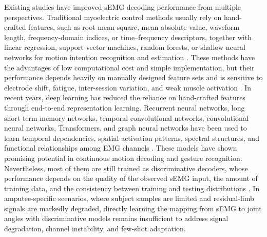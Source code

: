\documentclass[journal]{IEEEtran}
\begin{document}
Existing studies have improved sEMG decoding performance from multiple perspectives. Traditional myoelectric control methods usually rely on hand-crafted features, such as root mean square, mean absolute value, waveform length, frequency-domain indices, or time--frequency descriptors, together with linear regression, support vector machines, random forests, or shallow neural networks for motion intention recognition and estimation \cite{Zhong2026DeepFeature,Jiang2014Mapping,Englehart2003Robust}. These methods have the advantages of low computational cost and simple implementation, but their performance depends heavily on manually designed feature sets and is sensitive to electrode shift, fatigue, inter-session variation, and weak muscle activation \cite{Young2011Electrode,Du2017InterSession}. In recent years, deep learning has reduced the reliance on hand-crafted features through end-to-end representation learning. Recurrent neural networks, long short-term memory networks, temporal convolutional networks, convolutional neural networks, Transformers, and graph neural networks have been used to learn temporal dependencies, spatial activation patterns, spectral structures, and functional relationships among EMG channels \cite{Zhong2026DeepFeature,Xiong2021Deep,Zanghieri2020Robust,Sun2022Deep,Zhong2023STGCN,Lee2023Stretchable}. These models have shown promising potential in continuous motion decoding and gesture recognition. Nevertheless, most of them are still trained as discriminative decoders, whose performance depends on the quality of the observed sEMG input, the amount of training data, and the consistency between training and testing distributions \cite{Zhong2026DeepFeature,Wei2024Continuous}. In amputee-specific scenarios, where subject samples are limited and residual-limb signals are markedly degraded, directly learning the mapping from sEMG to joint angles with discriminative models remains insufficient to address signal degradation, channel instability, and few-shot adaptation.
\end{document}
